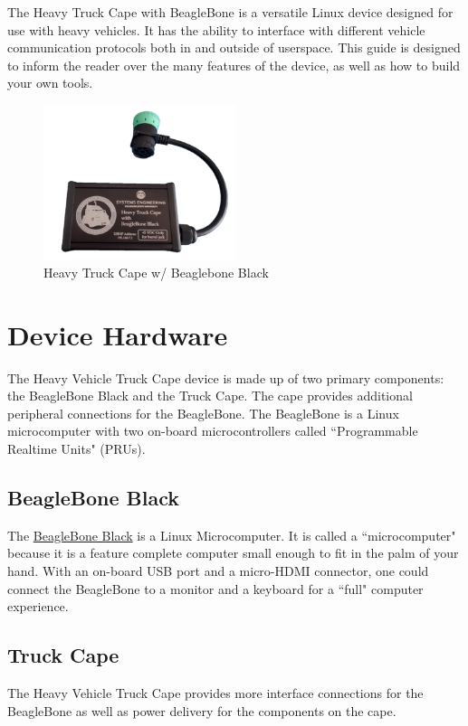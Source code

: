 The Heavy Truck Cape with BeagleBone is a versatile Linux device designed for use with heavy vehicles. It has the ability to interface with different vehicle communication protocols both in and outside of userspace. This guide is designed to inform the reader over the many features of the device, as well as how to build your own tools.

\begin{figure}[h]
    \centering
    \includegraphics[width=0.5\textwidth]{images/beagleboneblack_truckcape_v4_images/BeagleboneTC.png}
    \caption{Heavy Truck Cape w/ Beaglebone Black}
    \label{fig:Beaglebone Black}
\end{figure}


\section{Device Hardware}
    The Heavy Vehicle Truck Cape device is made up of two primary components: the BeagleBone Black and the Truck Cape. The cape provides additional peripheral connections for the BeagleBone. The BeagleBone is a Linux microcomputer with two on-board microcontrollers called ``Programmable Realtime Units" (PRUs).

    \subsection{BeagleBone Black}
        The \href{https://beagleboard.org/black}{BeagleBone Black} is a Linux Microcomputer. It is called a ``microcomputer" because it is a feature complete computer small enough to fit in the palm of your hand. With an on-board USB port and a micro-HDMI connector, one could connect the BeagleBone to a monitor and a keyboard for a ``full" computer experience. 

    \subsection{Truck Cape}
        The Heavy Vehicle Truck Cape provides more interface connections for the BeagleBone as well as power delivery for the components on the cape. 


